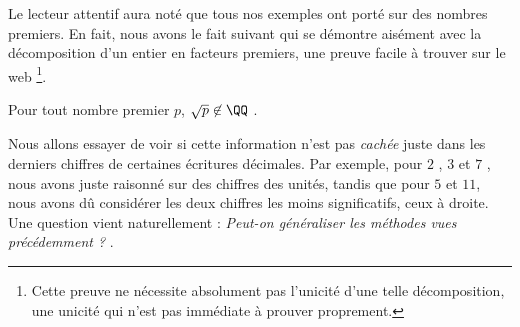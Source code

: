 Le lecteur attentif aura noté que tous nos exemples ont porté sur des nombres premiers.
En fait, nous avons le fait suivant qui se démontre aisément avec la décomposition d'un entier en facteurs premiers, une preuve facile à trouver sur le web
\footnote{
	Cette preuve ne nécessite absolument pas l'unicité d'une telle décomposition, une unicité qui n'est pas immédiate à prouver proprement.
}.


\begin{fact}  \label{sqrt-p-not-in-Q}
	Pour tout nombre premier $p$, $\sqrt{p} \not\in \QQ$ .
\end{fact}


Nous allons essayer de voir si cette information n'est pas \emph{\og cachée \fg} juste dans les derniers chiffres de certaines écritures décimales.
Par exemple, pour $2$ , $3$ et $7$ , nous avons juste raisonné sur des chiffres des unités, tandis que pour $5$ et $11$, nous avons dû considérer les deux chiffres les moins significatifs, ceux à droite.
Une question vient naturellement : \emph{\og Peut-on généraliser les méthodes vues précédemment ? \fg}.